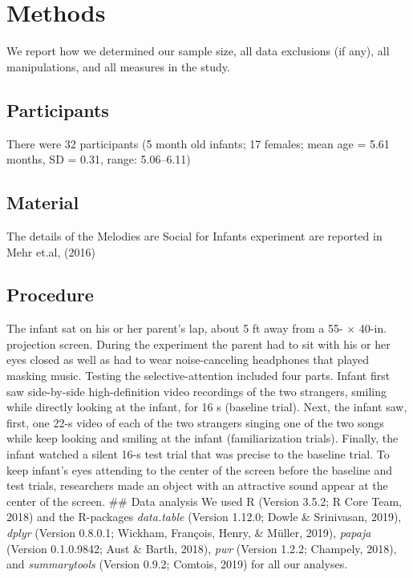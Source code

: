 \documentclass[man]{apa6}
\begin{document}
\section{Methods}\label{methods}

We report how we determined our sample size, all data exclusions (if
any), all manipulations, and all measures in the study.

\subsection{Participants}\label{participants}

There were 32 participants (5 month old infants; 17 females; mean age =
5.61 months, SD = 0.31, range: 5.06--6.11)

\subsection{Material}\label{material}

The details of the Melodies are Social for Infants experiment are
reported in Mehr et.al, (2016)

\subsection{Procedure}\label{procedure}

The infant sat on his or her parent's lap, about 5 ft away from a 55- ×
40-in. projection screen. During the experiment the parent had to sit
with his or her eyes closed as well as had to wear noise-canceling
headphones that played masking music. Testing the selective-attention
included four parts. Infant first saw side-by-side high-definition video
recordings of the two strangers, smiling while directly looking at the
infant, for 16 s (baseline trial). Next, the infant saw, first, one 22-s
video of each of the two strangers singing one of the two songs while
keep looking and smiling at the infant (familiarization trials).
Finally, the infant watched a silent 16-s test trial that was precise to
the baseline trial. To keep infant's eyes attending to the center of the
screen before the baseline and test trials, researchers made an object
with an attractive sound appear at the center of the screen. \#\# Data
analysis We used R (Version 3.5.2; R Core Team, 2018) and the R-packages
\emph{data.table} (Version 1.12.0; Dowle \& Srinivasan, 2019),
\emph{dplyr} (Version 0.8.0.1; Wickham, François, Henry, \& Müller,
2019), \emph{papaja} (Version 0.1.0.9842; Aust \& Barth, 2018),
\emph{pwr} (Version 1.2.2; Champely, 2018), and \emph{summarytools}
(Version 0.9.2; Comtois, 2019) for all our analyses.
\end{document}
